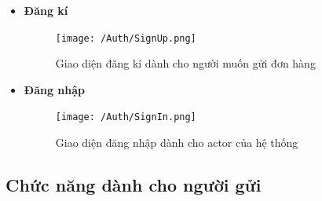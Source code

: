 	\begin{itemize}
		\item \textbf{Đăng kí}
			\begin{figure}[H]
				\texttt{[image: /Auth/SignUp.png]}
				\centering
				\caption{Giao diện đăng kí dành cho người muốn gửi đơn hàng}
			\end{figure}
		
		\item \textbf{Đăng nhập}
		\begin{figure}[H]
			\texttt{[image: /Auth/SignIn.png]}
			\centering
			\caption{Giao diện đăng nhập dành cho actor của hệ thống}
		\end{figure}
	\end{itemize}

\subsection{Chức năng dành cho người gửi}
